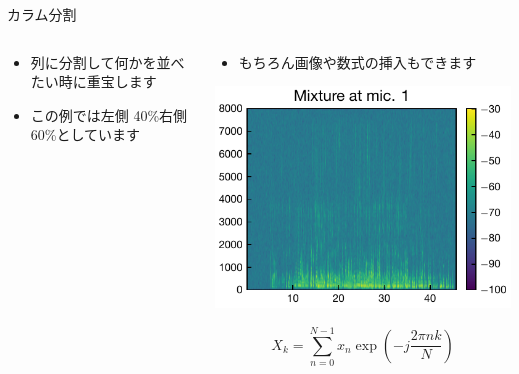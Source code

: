 \documentclass[
  ignorenonframetext,
]{beamer}
\providecommand{\tightlist}{%
  \setlength{\itemsep}{0pt}\setlength{\parskip}{0pt}}
\begin{document}
\begin{frame}{カラム分割}
\label{ux30abux30e9ux30e0ux5206ux5272}
\begin{columns}[T]
\begin{column}{0.4\textwidth}
\begin{itemize}
\tightlist
\item
  列に分割して何かを並べたい時に重宝します
\item
  この例では左側 40\%右側 60\%としています
\end{itemize}
\end{column}

\begin{column}{0.6\textwidth}
\begin{itemize}
\tightlist
\item
  もちろん画像や数式の挿入もできます
\end{itemize}

\includegraphics{spec.pdf}

\[X_k = \sum _{n=0} ^{N-1} x_n \exp \left(- j\frac{2\pi n k}{N} \right)\]
\end{column}
\end{columns}
\end{frame}
\end{document}
